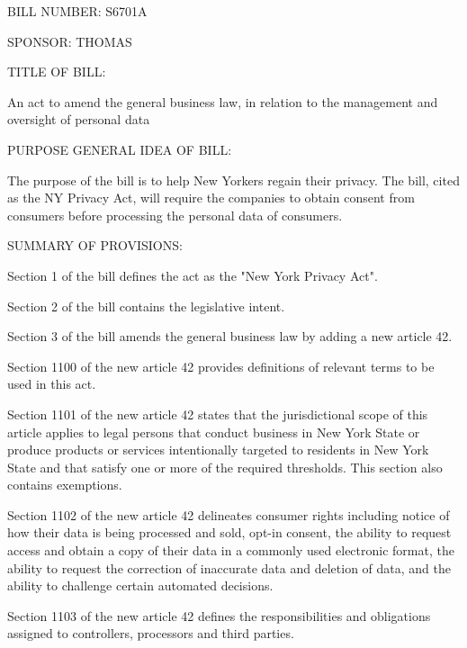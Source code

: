 BILL NUMBER: S6701A

SPONSOR: THOMAS
 
TITLE OF BILL:

An act to amend the general business law, in relation to the management
and oversight of personal data

 
PURPOSE GENERAL IDEA OF BILL:

The purpose of the bill is to help New Yorkers regain their privacy.
The bill, cited as the NY Privacy Act, will require the companies to
obtain consent from consumers before processing the personal data of
consumers.

 
SUMMARY OF PROVISIONS:

Section 1 of the bill defines the act as the "New York Privacy Act".

Section 2 of the bill contains the legislative intent.

Section 3 of the bill amends the general business law by adding a new
article 42.

Section 1100 of the new article 42 provides definitions of relevant
terms to be used in this act.

Section 1101 of the new article 42 states that the jurisdictional scope
of this article applies to legal persons that conduct business in New
York State or produce products or services intentionally targeted to
residents in New York State and that satisfy one or more of the required
thresholds. This section also contains exemptions.

Section 1102 of the new article 42 delineates consumer rights including
notice of how their data is being processed and sold, opt-in consent,
the ability to request access and obtain a copy of their data in a
commonly used electronic format, the ability to request the correction
of inaccurate data and deletion of data, and the ability to challenge
certain automated decisions.

Section 1103 of the new article 42 defines the responsibilities and
obligations assigned to controllers, processors and third parties.

